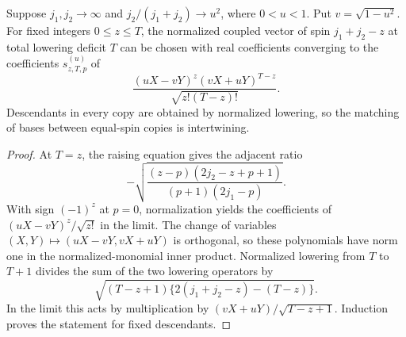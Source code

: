 \begin{lemma}\label{lem:coupling}
Suppose $j_1,j_2\to\infty$ and $j_2/(j_1+j_2)\to u^2$, where $0<u<1$. Put $v=\sqrt{1-u^2}$. For fixed integers $0\le z\le T$, the normalized coupled vector of spin $j_1+j_2-z$ at total lowering deficit $T$ can be chosen with real coefficients converging to the coefficients $s^{(u)}_{z,T,p}$ of
\begin{equation}\label{eq:coupling}
 \frac{(uX-vY)^z(vX+uY)^{T-z}}{\sqrt{z!(T-z)!}}.
\end{equation}
Descendants in every copy are obtained by normalized lowering, so the matching of bases between equal-spin copies is intertwining.
\end{lemma}
\begin{proof}
At $T=z$, the raising equation gives the adjacent ratio
\[
 -\sqrt{\frac{(z-p)(2j_2-z+p+1)}{(p+1)(2j_1-p)}}.
\]
With sign $(-1)^z$ at $p=0$, normalization yields the coefficients of $(uX-vY)^z/\sqrt{z!}$ in the limit. The change of variables $(X,Y)\mapsto(uX-vY,vX+uY)$ is orthogonal, so these polynomials have norm one in the normalized-monomial inner product. Normalized lowering from $T$ to $T+1$ divides the sum of the two lowering operators by
\[
 \sqrt{(T-z+1)\{2(j_1+j_2-z)-(T-z)\}}.
\]
In the limit this acts by multiplication by $(vX+uY)/\sqrt{T-z+1}$. Induction proves the statement for fixed descendants.
\end{proof}
